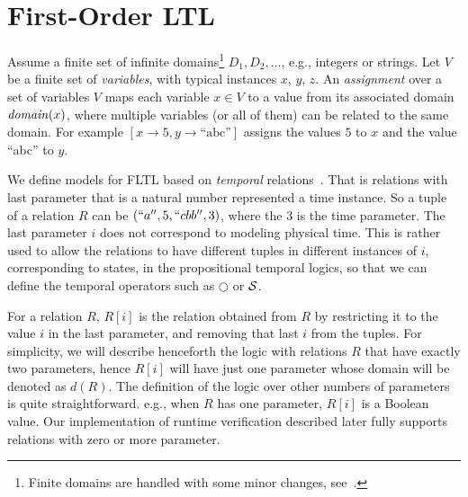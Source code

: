\section{First-Order LTL}

\label{sec:syntax-semantics}

Assume a finite set of infinite domains\footnote{Finite domains are handled with some minor changes, see~\cite{HPU}.}
$D_1, D_2, \ldots$,
e.g., integers or strings. 
Let $V$ be a finite set of {\em variables}, 
with typical instances $x$, $y$, $z$.
An {\em assignment} over a set of variables $V$
maps each variable $x \in V$ to a value from
its associated domain $\mathit{domain} ( x )$, where multiple variables (or all of them)
can be related to the same domain. For example
$[ x \rightarrow 5 , y \rightarrow \text{``abc''} ]$ assigns
the values $5$ to $x$ and the value ``abc'' to $y$.


We define models for FLTL based on {\em temporal} relations~\cite{Chomicki}. That is relations with
last parameter
that is a natural number represented a time instance. So a tuple of
a relation $R$ can be $(``a'', 5, ``cbb'', 3)$, where
the $3$ is the time parameter. The last parameter $i$
does not correspond to modeling physical time. This
is rather used to allow the relations to have
different tuples in different instances of $i$,
corresponding to states, in the propositional temporal
logics, so that we can define the temporal operators
such as $\bigcirc$ or ${\cal S}$.

For a relation $R$, $R [ i ]$ is the relation obtained from $R$ by
restricting it to the value $i$ in the last parameter, and removing that last $i$ from the tuples. For simplicity, we will describe henceforth
the logic with relations $R$ that have exactly two parameters, 
hence $R [ i ]$ will have just one parameter whose domain will be denoted as $d ( R )$. The definition of the logic over other numbers of parameters is quite straightforward. e.g., when $R$ has one parameter,
$R [ i ]$ is a Boolean value. Our implementation of runtime verification described later fully supports relations with zero or more parameter.

